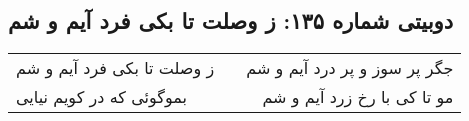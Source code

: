 \begin{center}
\section*{دوبیتی شماره ۱۳۵: ز وصلت تا بکی فرد آیم و شم}
\label{sec:135}
\begin{longtable}{l p{0.5cm} r}
ز وصلت تا بکی فرد آیم و شم
&&
جگر پر سوز و پر درد آیم و شم
\\
بموگوئی که در کویم نیایی
&&
مو تا کی با رخ زرد آیم و شم
\\
\end{longtable}
\end{center}
